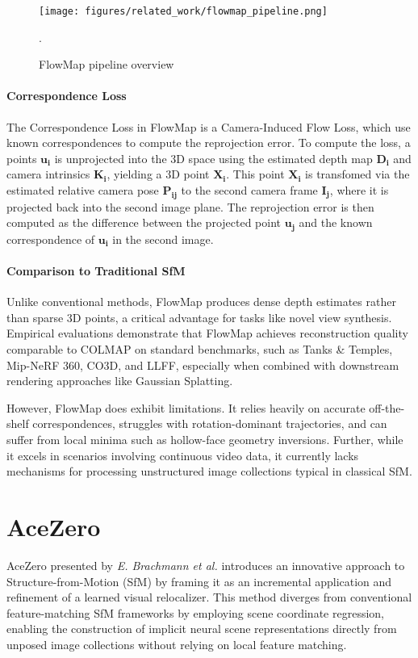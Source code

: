 \begin{figure}[h]
    \centering
    \texttt{[image: figures/related\_work/flowmap\_pipeline.png]}
    \caption{FlowMap pipeline overview \cite{smith24flowmap}}.
    \label{fig:flowmap}
\end{figure}

\paragraph{Correspondence Loss}
The Correspondence Loss in FlowMap is a Camera-Induced Flow Loss, which use known correspondences to compute the reprojection error. 
To compute the loss, a points $\mathbf{u_i}$ is unprojected into the 3D space using the estimated depth map $\mathbf{D_i}$ and camera intrinsics $\mathbf{K_i}$, yielding a 3D point $\mathbf{X_i}$.
This point $\mathbf{X_i}$ is transfomed via the estimated relative camera pose $\mathbf{P_{ij}}$ to the second camera frame $\mathbf{I_j}$, where it is projected back into the second image plane.
The reprojection error is then computed as the difference between the projected point $\mathbf{u_j}$ and the known correspondence of $\mathbf{u_i}$ in the second image.


\paragraph{Comparison to Traditional SfM}
Unlike conventional methods, FlowMap produces dense depth estimates rather than sparse 3D points, a critical advantage for tasks like novel view synthesis. 
Empirical evaluations demonstrate that FlowMap achieves reconstruction quality comparable to COLMAP on standard benchmarks, such as Tanks \& Temples, Mip-NeRF 360, CO3D, and LLFF, especially when combined with downstream rendering approaches like Gaussian Splatting.

However, FlowMap does exhibit limitations. It relies heavily on accurate off-the-shelf correspondences, struggles with rotation-dominant trajectories, and can suffer from local minima such as hollow-face geometry inversions. 
Further, while it excels in scenarios involving continuous video data, it currently lacks mechanisms for processing unstructured image collections typical in classical SfM.

\section{AceZero}\label{sec:acezero}
AceZero \cite{brachmann2024acezero} presented by \textit{E. Brachmann et al.} introduces an innovative approach to Structure-from-Motion (SfM) by framing it as an incremental application and refinement of a learned visual relocalizer. 
This method diverges from conventional feature-matching SfM frameworks by employing scene coordinate regression, enabling the construction of implicit neural scene representations directly from unposed image collections without relying on local feature matching.

